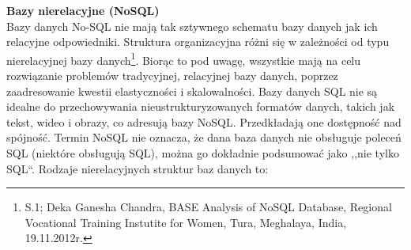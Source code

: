 \documentclass[12pt, a4paper, twoside, openany]{book}
\newcommand{\forceindent}{\leavevmode{\parindent=1.3em\indent}}
\begin{document}
\forceindent \textbf{Bazy nierelacyjne (NoSQL)}\\
\forceindent Bazy danych No-SQL nie mają tak sztywnego schematu bazy danych jak ich relacyjne odpowiedniki.
Struktura organizacyjna różni się w zależności od typu nierelacyjnej bazy danych\footnote{S.1; Deka Ganesha Chandra, BASE Analysis of NoSQL Database, Regional Vocational Training Instutite for Women, Tura, Meghalaya, India, 19.11.2012r.}.
Biorąc to pod uwagę, wszystkie mają na celu rozwiązanie problemów tradycyjnej, relacyjnej bazy danych, poprzez zaadresowanie kwestii elastyczności i skalowalności.
Bazy danych SQL nie są idealne do przechowywania nieustrukturyzowanych formatów danych, takich jak tekst, wideo i obrazy, co adresują bazy NoSQL.
Przedkładają one dostępność nad spójność.
Termin NoSQL nie oznacza, że dana baza danych nie obsługuje poleceń SQL (niektóre obsługują SQL), można go dokładnie podsumować jako ,,nie tylko SQL``.
Rodzaje nierelacyjnych struktur baz danych to:
\end{document}
